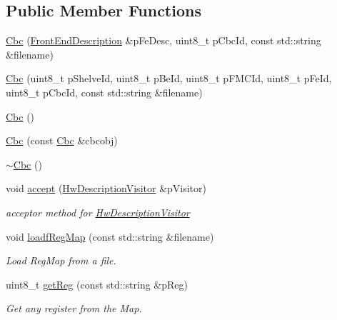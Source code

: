 \subsection*{Public Member Functions}
\begin{CompactItemize}
\item 
\hyperlink{class_ph2___hw_description_1_1_cbc_f1d0b102272e6d4fabebbee4ec1c0002}{Cbc} (\hyperlink{class_ph2___hw_description_1_1_front_end_description}{Front\-End\-Description} \&p\-Fe\-Desc, uint8\_\-t p\-Cbc\-Id, const std::string \&filename)
\item 
\hyperlink{class_ph2___hw_description_1_1_cbc_66126a536d5ba0a7148bb33627a73357}{Cbc} (uint8\_\-t p\-Shelve\-Id, uint8\_\-t p\-Be\-Id, uint8\_\-t p\-FMCId, uint8\_\-t p\-Fe\-Id, uint8\_\-t p\-Cbc\-Id, const std::string \&filename)
\item 
\hyperlink{class_ph2___hw_description_1_1_cbc_5b7124456823871d611ada17ed0a51a1}{Cbc} ()
\item 
\hyperlink{class_ph2___hw_description_1_1_cbc_b529cbb8cbbbc3b28a7ca2a472d4aa50}{Cbc} (const \hyperlink{class_ph2___hw_description_1_1_cbc}{Cbc} \&cbcobj)
\item 
\hyperlink{class_ph2___hw_description_1_1_cbc_4e641d292073978e6e1b34fa91c13067}{$\sim$Cbc} ()
\item 
void \hyperlink{class_ph2___hw_description_1_1_cbc_fb8fe9bb4c72aa33ccc94653fd4bd9fd}{accept} (\hyperlink{class_hw_description_visitor}{Hw\-Description\-Visitor} \&p\-Visitor)
\begin{CompactList}\small\item\em acceptor method for \hyperlink{class_hw_description_visitor}{Hw\-Description\-Visitor} \item\end{CompactList}\item 
void \hyperlink{class_ph2___hw_description_1_1_cbc_8cde19bba99aebac03f0ed86b96295e9}{loadf\-Reg\-Map} (const std::string \&filename)
\begin{CompactList}\small\item\em Load Reg\-Map from a file. \item\end{CompactList}\item 
uint8\_\-t \hyperlink{class_ph2___hw_description_1_1_cbc_43d08080490a85b26bc172456a776048}{get\-Reg} (const std::string \&p\-Reg)
\begin{CompactList}\small\item\em Get any register from the Map. \item\end{CompactList}\item 

\end{CompactItemize}
